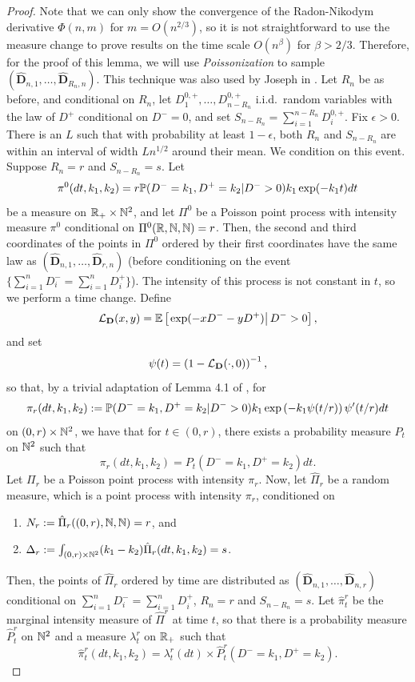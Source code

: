 \begin{proof}
Note that we can only show the convergence of the Radon-Nikodym derivative $\Phi(n,m)$ for $m=O(n^{2/3})$, so it is not straightforward to use the measure change to prove results on the time scale $O(n^\beta)$ for $\beta>2/3$. Therefore, for the proof of this lemma, we will use \emph{Poissonization} to sample $(\mathbf{\hat{D}}_{n,1},\dots,\mathbf{\hat{D}}_{R_n,n})$. This technique was also used by Joseph in \cite{josephComponentSizesCritical2014}. Let $R_n$ be as before, and conditional on $R_n$, let $D^{0,+}_1,\dots,D^{0,+}_{n-R_n}$ i.i.d.\ random variables with the law of $D^+$ conditional on $D^-=0$, and set $S_{n-R_n}=\sum_{i=1}^{n-R_n}D^{0,+}_i$. Fix $\epsilon>0$. There is an $L$ such that with probability at least $1-\epsilon$, both $R_n$ and $S_{n-R_n}$ are within an interval of width $Ln^{1/2}$ around their mean. We condition on this event. Suppose $R_n=r$ and $S_{n-R_n}=s$. 
Let
$$\pi^0(dt,k_1,k_2)=r\P(D^-=k_1,D^+=k_2|D^->0)k_1\exp(-k_1 t)dt$$
be a measure on $\R_+\times \N^2$, and let $\Pi^0$ be a Poisson point process with intensity measure $\pi^0$ conditional on $\Pi^0(\R,\N,\N)=r$. Then, the second and third coordinates of the points in $\Pi^0$ ordered by their first coordinates have the same law as $(\mathbf{\hat{D}}_{n,1},\dots,\mathbf{\hat{D}}_{r,n})$ (before conditioning on the event $\{\sum_{i=1}^nD^-_i=\sum_{i=1}^nD^+_i\}$).  
The intensity of this process is not constant in $t$, so we perform a time change. Define
$$\cL_{\mathbf{D}}(x,y)=\E\left[\left.\exp(-xD^--yD^+)\right|D^->0 \right],$$
and set 
$$\psi(t)=\left(1-\cL_{\mathbf{D}}(\cdot,0)\right)^{-1},$$
so that, by a trivial adaptation of Lemma 4.1 of \cite{josephComponentSizesCritical2014}, for 
$$\pi_r(dt,k_1,k_2):=\P(D^-=k_1,D^+=k_2|D^->0)k_1\exp\left(-k_1 \psi(t/r)\right)\psi'(t/r)dt$$
on $(0,r)\times \N^2$, we have that for $t\in (0,r)$, there exists a probability measure $P_t$ on $\N^2$ such that
$$\pi_r(dt,k_1,k_2)=P_t(D^-=k_1,D^+=k_2)dt.$$
Let ${\Pi}_r$ be a Poisson point process with intensity $\pi_r$.  Now, let $\hat{\Pi}_r$ be a random measure, which is a point process with intensity $\pi_r$, conditioned on 
\begin{enumerate}
    \item $N_r:= \hat{\Pi}_r((0,r),\N,\N)=r$, and 
    \item $\Delta_r:=\int_{(0,r)\times \N^2}(k_1-k_2) \hat{\Pi}_r(dt,k_1,k_2)=s$.
\end{enumerate}
Then, the points of $\hat{\Pi}_r$ ordered by time are distributed as $(\mathbf{\hat{D}}_{n,1},\dots,\mathbf{\hat{D}}_{n,r})$ conditional on $\sum_{i=1}^nD^-_i=\sum_{i=1}^nD^+_i$, $R_n=r$ and $S_{n-R_n}=s$. Let $\hat{\pi}^r_t$ be the marginal intensity measure of $\hat{\Pi}^r$ at time $t$, so that there is a probability measure $\hat{P}^r_t$ on $\N^2$  and a measure $\lambda^r_t$ on $\R_+$ such that $$\hat{\pi}^r_t(dt,k_1,k_2)=\lambda^r_t(dt)\times \hat{P}^r_t(D^-=k_1, D^+=k_2).$$

\end{proof}
